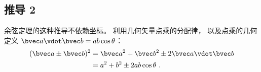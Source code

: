 \subsection{推导 2}
余弦定理的这种推导不依赖坐标。 利用几何矢量点乘的分配律， 以及点乘的几何定义 $\bvec a \vdot \bvec b = ab\cos\theta$：
\begin{equation}\label{eq_CosThe_2}
\begin{aligned}
(\bvec a \pm \bvec b)^2 &= \bvec a^2 + \bvec b^2 \pm 2\bvec a \vdot \bvec b\\
&= a^2 + b^2 \pm 2ab \cos\theta~.
\end{aligned}
\end{equation}
